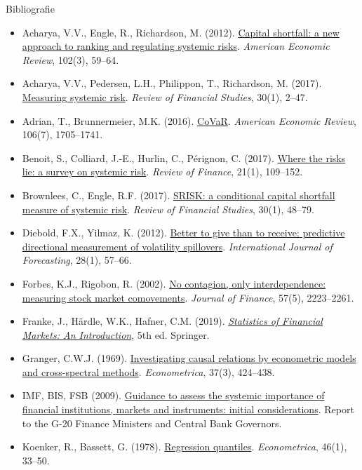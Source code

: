\begin{frame}{Bibliografie}
\itemsize{\tiny}
\begin{itemize}
    \item Acharya, V.V., Engle, R., Richardson, M. (2012). \href{https://doi.org/10.1257/aer.102.3.59}{Capital shortfall: a new approach to ranking and regulating systemic risks}. \textit{American Economic Review}, 102(3), 59--64.
    \item Acharya, V.V., Pedersen, L.H., Philippon, T., Richardson, M. (2017). \href{https://doi.org/10.1093/rfs/hhw088}{Measuring systemic risk}. \textit{Review of Financial Studies}, 30(1), 2--47.
    \item Adrian, T., Brunnermeier, M.K. (2016). \href{https://doi.org/10.1257/aer.20120555}{CoVaR}. \textit{American Economic Review}, 106(7), 1705--1741.
    \item Benoit, S., Colliard, J.-E., Hurlin, C., Pérignon, C. (2017). \href{https://doi.org/10.1093/rof/rfw026}{Where the risks lie: a survey on systemic risk}. \textit{Review of Finance}, 21(1), 109--152.
    \item Brownlees, C., Engle, R.F. (2017). \href{https://doi.org/10.1093/rfs/hhw060}{SRISK: a conditional capital shortfall measure of systemic risk}. \textit{Review of Financial Studies}, 30(1), 48--79.
    \item Diebold, F.X., Yilmaz, K. (2012). \href{https://doi.org/10.1016/j.ijforecast.2011.02.006}{Better to give than to receive: predictive directional measurement of volatility spillovers}. \textit{International Journal of Forecasting}, 28(1), 57--66.
    \item Forbes, K.J., Rigobon, R. (2002). \href{https://doi.org/10.1111/0022-1082.00494}{No contagion, only interdependence: measuring stock market comovements}. \textit{Journal of Finance}, 57(5), 2223--2261.
    \item Franke, J., Härdle, W.K., Hafner, C.M. (2019). \href{https://doi.org/10.1007/978-3-030-13751-9}{\textit{Statistics of Financial Markets: An Introduction}}, 5th ed. Springer.
    \item Granger, C.W.J. (1969). \href{https://doi.org/10.2307/1912791}{Investigating causal relations by econometric models and cross-spectral methods}. \textit{Econometrica}, 37(3), 424--438.
    \item IMF, BIS, FSB (2009). \href{https://www.bis.org/publ/othp07.htm}{Guidance to assess the systemic importance of financial institutions, markets and instruments: initial considerations}. Report to the G-20 Finance Ministers and Central Bank Governors.
    \item Koenker, R., Bassett, G. (1978). \href{https://doi.org/10.2307/1913643}{Regression quantiles}. \textit{Econometrica}, 46(1), 33--50.
\end{itemize}
\end{frame}


